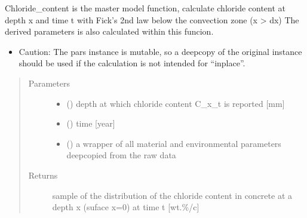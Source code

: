 \documentclass[letterpaper,10pt,english]{sphinxmanual}
\begin{document}

\begin{fulllineitems}
\label{\detokenize{chloride:chloride.Chloride_content}}
\sphinxAtStartPar
Chloride\_content is the master model function, calculate chloride content at depth x and time t with Fick’s 2nd law below the convection zone (x \textgreater{} dx)
The derived parameters is also calculated within this funcion.
\begin{itemize}
\item {} 
\sphinxAtStartPar
Caution: The pars instance is mutable, so a deepcopy of the original instance should be used if the calculation is not intended for “inplace”.

\end{itemize}
\begin{quote}\begin{description}
\item[{Parameters}] \leavevmode\begin{itemize}
\item {} 
\sphinxAtStartPar
{} (\sphinxstyleliteralemphasis{\sphinxupquote{, }}) \textendash{} depth at which chloride content C\_x\_t is reported {[}mm{]}

\item {} 
\sphinxAtStartPar
{} (\sphinxstyleliteralemphasis{\sphinxupquote{, }}) \textendash{} time {[}year{]}

\item {} 
\sphinxAtStartPar
{} () \textendash{} a wrapper of all material and environmental parameters deep\sphinxhyphen{}copied from the raw data

\end{itemize}

\item[{Returns}] \leavevmode
\sphinxAtStartPar
sample of the distribution of the chloride content in concrete at a depth x (suface x=0) at time t {[}wt\sphinxhyphen{}.\%/c{]}


\end{description}
\end{quote}
\end{fulllineitems}
\end{document}
